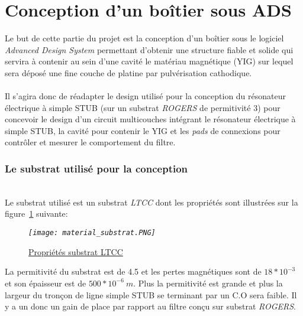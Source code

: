 \documentclass[12pt,fleqn]{book} %
\begin{document}
\setcounter{chapter}{1}
\setcounter{section}{0}
\part{Conception d'un boîtier sous ADS}
Le but de cette partie du projet est la conception d’un boîtier sous le logiciel \emph{Advanced Design System} permettant d’obtenir une structure fiable et solide qui servira à contenir au sein d’une cavité le matériau magnétique (YIG) sur lequel sera déposé une fine couche de platine par pulvérisation cathodique.
~\\\\Il s'agira donc de réadapter le design utilisé pour la conception du résonateur électrique à simple STUB (sur un substrat \emph{ROGERS} de permitivité 3) pour concevoir le design d'un circuit multicouches intégrant le résonateur électrique à simple STUB, la cavité pour contenir le YIG et les \emph{pads} de connexions pour contrôler et mesurer le comportement du filtre.
\section{Le substrat utilisé pour la conception}
~\\\noindent
Le substrat utilisé est un substrat \emph{LTCC} dont les propriétés sont illustrées sur la figure~\underline{\color{blue}\ref{substrat}} suivante:
\begin{figure}[H]
	\centering
	\itshape
	\texttt{[image: material\_substrat.PNG]}
	\caption{\label{substrat} \underline{Propriétés substrat LTCC}}
\end{figure}
\noindent La permitivité du substrat est de 4.5 et les pertes magnétiques sont de $18*10^{-3}$ et son épaisseur est de  $500*10^{-6}\ m$. Plus la permitivité est grande et plus la largeur du tronçon de ligne simple STUB se terminant par un C.O sera faible. Il y a un donc un gain de place par rapport au filtre conçu sur substrat \emph{ROGERS}.
\end{document}
